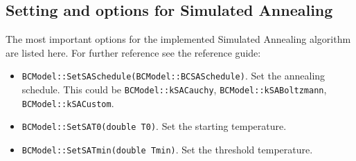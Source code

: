 \documentclass[11pt, a4paper]{article}
\begin{document}

\subsection{Setting and options for Simulated Annealing} 
\label{section:settings:SA} 

The most important options for the implemented Simulated Annealing
algorithm are listed here. For further reference see the reference
guide:
%
\begin{itemize}
\item \verb|BCModel::SetSASchedule(BCModel::BCSASchedule)|. Set the
  annealing schedule. This could be \verb|BCModel::kSACauchy|,
  \verb|BCModel::kSABoltzmann|, \verb|BCModel::kSACustom|. 
\item \verb|BCModel::SetSAT0(double T0)|. Set the starting
  temperature. 
\item \verb|BCModel::SetSATmin(double Tmin)|. Set the threshold
  temperature. 
\end{itemize}






\end{document}
